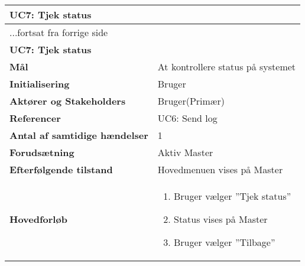 \begin{center} \centering \label{UC7}
	\begin{longtable}{|p{5cm}|p{9cm}|}  %
	\hline
		\multicolumn{2}{|l|}{\textbf{UC7: Tjek status}} \\\hline %
		\endfirsthead
		
		\multicolumn{2}{l}{...fortsat fra forrige side} \\ \hline %
		\multicolumn{2}{|l|}{\textbf{UC7: Tjek status}} \\\hline %
		\endhead	
		
		\textbf{Mål}								&At kontrollere status på systemet			\\\hline
		\textbf{Initialisering}					&Bruger							\\\hline
		\textbf{Aktører og Stakeholders}			&Bruger(Primær)					\\\hline
		\textbf{Referencer}						&UC6: Send log					\\\hline
		\textbf{Antal af samtidige hændelser}	&1								\\\hline
		\textbf{Forudsætning}					&Aktiv Master				\\\hline
		\textbf{Efterfølgende tilstand}			&Hovedmenuen vises på Master			\\\hline
		\textbf{Hovedforløb}					
			&\begin{enumerate}
	
				\item Bruger vælger ''Tjek status''
				
				\item Status vises på Master
				
				\item Bruger vælger ''Tilbage''
	
			\end{enumerate}\\\hline
	\end{longtable} 
\end{center}

